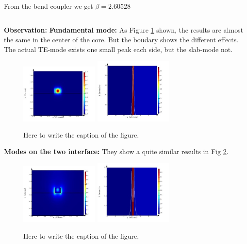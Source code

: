 \documentclass[fontsize=11pt]{scrartcl}
\begin{document}
\subsection{}
From the bend coupler we get $\beta=2.60528$
\subsection{}
\textbf{Observation:}
\textbf{Fundamental mode:} As Figure \ref{fig1.1} shown, 
the results are almost the same in the center of the core. 
But the boudary shows the different effects. 
The actual TE-mode exists one small peak each side, but the slab-mode not.
\begin{figure}[H]
    \centering
     \includegraphics[width=0.35\textwidth]{img/fig1.1a.jpg} %
     \includegraphics[width=0.35\textwidth]{img/fig1.1b.jpg}
     \caption{Here to write the caption of the figure.}
     \label{fig1.1}
\end{figure}
\textbf{Modes on the two interface:} They show a quite similar results in Fig \ref{fig1.2}.
\begin{figure}[H]
    \centering
     \includegraphics[width=0.35\textwidth]{img/fig1.2a.jpg} %
     \includegraphics[width=0.35\textwidth]{img/fig1.2b.jpg}
     \caption{Here to write the caption of the figure.}
     \label{fig1.2}
\end{figure}
\end{document}
